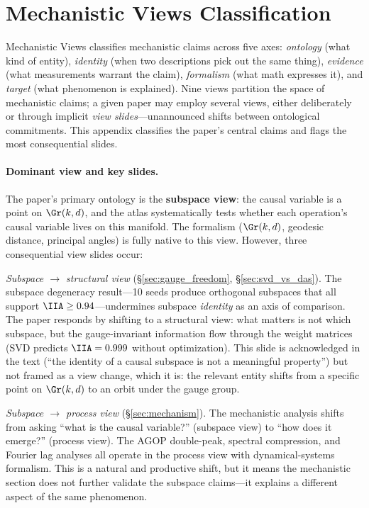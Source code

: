 
\section{Mechanistic Views Classification}
\label{app:mechviews}

Mechanistic Views \citep{tower2026mechviews} classifies mechanistic claims across five
axes: \emph{ontology} (what kind of entity), \emph{identity} (when two
descriptions pick out the same thing), \emph{evidence} (what measurements
warrant the claim), \emph{formalism} (what math expresses it), and
\emph{target} (what phenomenon is explained). Nine views partition the space
of mechanistic claims; a given paper may employ several views, either
deliberately or through implicit \emph{view slides}---unannounced shifts
between ontological commitments. This appendix classifies the paper's central
claims and flags the most consequential slides.

\paragraph{Dominant view and key slides.}
The paper's primary ontology is the \textbf{subspace view}: the causal
variable is a point on $\Gr(k,d)$, and the atlas systematically tests whether
each operation's causal variable lives on this manifold. The formalism
($\Gr(k,d)$, geodesic distance, principal angles) is fully native to this
view. However, three consequential view slides occur:

\emph{Subspace $\to$ structural view} (\S\ref{sec:gauge_freedom},
\S\ref{sec:svd_vs_das}). The subspace degeneracy result---10 seeds produce
orthogonal subspaces that all support $\IIA \geq 0.94$---undermines subspace
\emph{identity} as an axis of comparison. The paper responds by shifting to a
structural view: what matters is not which subspace, but the gauge-invariant
information flow through the weight matrices (SVD predicts $\IIA = 0.999$
without optimization). This slide is acknowledged in the text (``the identity
of a causal subspace is not a meaningful property'') but not framed as a view
change, which it is: the relevant entity shifts from a specific point on
$\Gr(k,d)$ to an orbit under the gauge group.

\emph{Subspace $\to$ process view} (\S\ref{sec:mechanism}). The mechanistic
analysis shifts from asking ``what is the causal variable?'' (subspace view)
to ``how does it emerge?'' (process view). The AGOP double-peak, spectral
compression, and Fourier lag analyses all operate in the process view with
dynamical-systems formalism. This is a natural and productive shift, but it
means the mechanistic section does not further validate the subspace claims---it
explains a different aspect of the same phenomenon.

